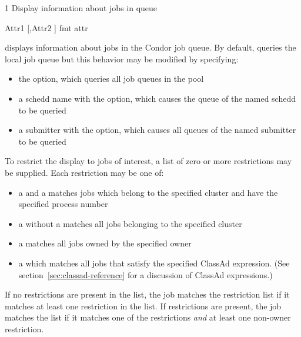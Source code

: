 \begin{ManPage}{\label{man-condor-q}}{1}
{Display information about jobs in queue}
\Synopsis {}

\ToolDebugOption
{} 
 {Attr1 [,Attr2 \Dots]}
 {fmt attr}


\Description
{} displays information about jobs in the Condor job queue.  By
default,  queries the local job queue but this behavior may be 
modified by specifying:
\begin{itemize}
	\item the  option, which queries all job queues in the pool
	\item a schedd name with the  option, which causes the queue of 
		the named schedd to be queried 
	\item a submitter with the  option, which causes all queues
		of the named submitter to be queried
\end{itemize}

To restrict the display to jobs of interest, a list of zero or more 
restrictions may be supplied.  Each restriction may be one of:
\begin{itemize}
	\item a  and a  matches jobs which
		belong to the specified cluster and have the specified process number
	\item a  without a  matches all jobs belonging
		to the specified cluster
	\item a  matches all jobs owned by the specified owner
	\item a  which matches all jobs that
		satisfy the specified ClassAd expression. (See section~\ref{sec:classad-reference}
		for a discussion of ClassAd expressions.)
\end{itemize}
If no  restrictions are present in the list, the job matches the 
restriction list if it matches at least one restriction in the list.  If 
 restrictions are present, the job matches the list if it matches 
one of the  restrictions \emph{and} at least one non-owner 
restriction.


\end{ManPage}
